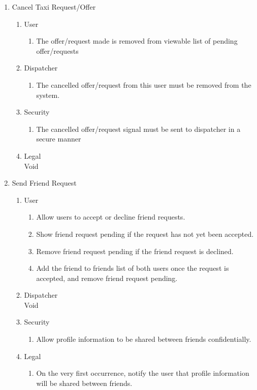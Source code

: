 \documentclass[english]{article}
\begin{document}
\begin{enumerate}[{BE}1.]
	\item Cancel Taxi Request/Offer
	\begin{enumerate}[{VP2}.1]
		\item User
			\begin{enumerate}
				\item The offer/request made is removed from viewable list of
				pending offer/requests
			\end{enumerate}
		\item Dispatcher
			\begin{enumerate}
				\item The cancelled offer/request from this user must be removed from the system.
			\end{enumerate}
		\item Security
			\begin{enumerate}
				\item The cancelled offer/request signal must be sent to dispatcher in a secure
				manner
			\end{enumerate}
		\item Legal\\
			Void
	\end{enumerate}
	
	\item Send Friend Request
	\begin{enumerate}[{VP2}.1]
		\item User
			\begin{enumerate}
				\item Allow users to accept or decline friend requests.
				\item Show friend request pending if the request has not yet been accepted.
				\item Remove friend request pending if the friend request is declined.
				\item Add the friend to friends list of both users once the request is accepted, and 
				remove friend request pending.
			\end{enumerate}
		\item Dispatcher\\
			Void
		\item Security
			\begin{enumerate}
				\item Allow profile information to be shared between friends confidentially.
			\end{enumerate}
		\item Legal
			\begin{enumerate}
				\item On the very first occurrence, notify the user that profile information will 
				be shared between friends.
			\end{enumerate}
	\end{enumerate}
	

\end{enumerate}
\end{document}
